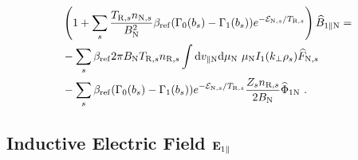 \begin{gather}
    \begin{aligned}
        &\left(1 + \sum_s \frac{T_{\mathrm{R},s}n_{\mathrm{N},s}}{B_\mathrm{N}^2} \beta_\mathrm{ref} (\Gamma_0(b_s) - \Gamma_1(b_s)) e^{-\mathcal{E}_{\mathrm{N},s}/T_{\mathrm{R},s}}\right) \widehat{B}_{1\parallel \mathrm{N}} = \\
        &-\sum_s \beta_\mathrm{ref} 2\pi B_\mathrm{N} T_{\mathrm{R},s} n_{\mathrm{R},s} \int \mathrm{d}v_{\parallel \mathrm{N}} \mathrm{d}\mu_\mathrm{N} ~ \mu_\mathrm{N} I_1(k_\perp \rho_s) \widehat{F}_{\mathrm{N},s} \\
        &-\sum_s \beta_\mathrm{ref} (\Gamma_0(b_s) - \Gamma_1(b_s)) e^{-\mathcal{E}_{\mathrm{N},s}/T_{\mathrm{R},s}} \frac{Z_sn_{\mathrm{R},s}}{2 B_\mathrm{N}} \widehat{\Phi}_{1 \mathrm{N}} ~.
    \end{aligned}
\end{gather}

\subsection*{Inductive Electric Field $\boldsymbol{\mathbf{E}}_{1 \parallel}$}
\label{sub:fieldEparLocal}


